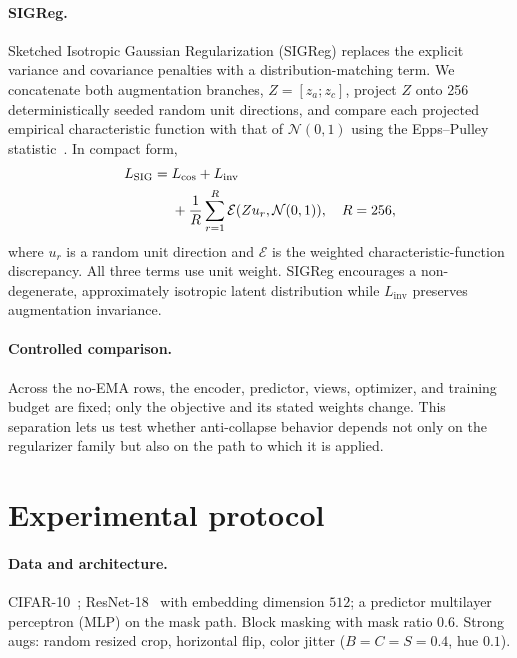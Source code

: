 \documentclass[11pt,twocolumn]{article}
\begin{document}
\paragraph{SIGReg.}
Sketched Isotropic Gaussian Regularization (SIGReg) replaces the explicit
variance and covariance penalties with a distribution-matching term. We
concatenate both augmentation branches, $Z=[z_a;z_c]$, project $Z$ onto 256
deterministically seeded random unit directions, and compare each projected
empirical characteristic function with that of $\mathcal{N}(0,1)$ using the
Epps--Pulley statistic~\citep{balestriero2025lejepa}. In compact form,
\begin{align}
 L_{\mathrm{SIG}}={}&L_{\mathrm{cos}}+L_{\mathrm{inv}} \notag\\
 &+\frac{1}{R}\sum_{r=1}^{R}
 \mathcal{E}(Z u_r,\mathcal{N}(0,1)),\quad R=256,
 \label{eq:sigreg}
\end{align}
where $u_r$ is a random unit direction and $\mathcal{E}$ is the weighted
characteristic-function discrepancy. All three terms use unit weight. SIGReg
encourages a non-degenerate, approximately isotropic latent distribution while
$L_{\mathrm{inv}}$ preserves augmentation invariance.

\paragraph{Controlled comparison.}
Across the no-EMA rows, the encoder, predictor, views, optimizer, and training
budget are fixed; only the objective and its stated weights change. This
separation lets us test whether anti-collapse behavior depends not only on the
regularizer family but also on the path to which it is applied.





\section{Experimental protocol}
\label{sec:protocol}

\paragraph{Data and architecture.}
CIFAR-10~\citep{krizhevsky2009cifar}; ResNet-18~\citep{he2016resnet}
with embedding dimension $512$; a predictor multilayer perceptron (MLP) on the mask path.
Block masking with mask ratio $0.6$.
Strong augs: random resized crop, horizontal flip, color jitter
($B{=}C{=}S{=}0.4$, hue $0.1$).
\end{document}
